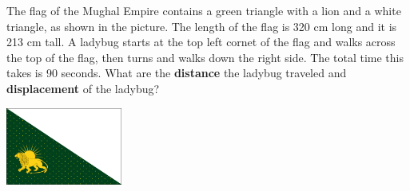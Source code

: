 \documentclass[11pt]{examdesign}
\begin{document}
\begin{shortanswer}[title={Free Response},
	rearrange=no]
\newpage

\begin{question}
The flag of the Mughal Empire contains a green triangle with a lion and a white triangle, as shown in the picture. The length of the flag is 320 cm long and  it is 213 cm tall.  A ladybug starts at the top left cornet of the flag and walks across the top of the flag, then turns and walks down the right side.  The total time this takes is 90 seconds.  What are the \textbf{distance} the ladybug traveled and \textbf{displacement} of the ladybug?

\begin{center} \includegraphics[height=1in]{flag.png} \end{center}


	
	
	\vspace{2in}
	
	
	
\end{question}




	\end{shortanswer}
\end{document}
